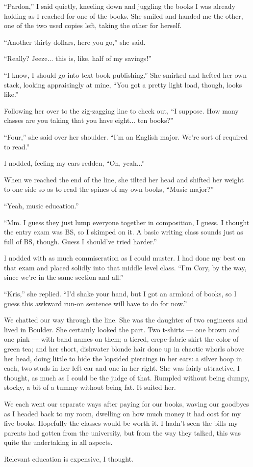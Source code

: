 ``Pardon,'' I said quietly, kneeling down and juggling the books I was already holding as I reached for one of the books.  She smiled and handed me the other, one of the two used copies left, taking the other for herself.

``Another thirty dollars, here you go,'' she said.

``Really?  Jeeze... this is, like, half of my savings!''

``I know, I should go into text book publishing.''  She smirked and hefted her own stack, looking appraisingly at mine, ``You got a pretty light load, though, looks like.''

Following her over to the zig-zagging line to check out, ``I suppose.  How many classes are you taking that you have eight... ten books?''

``Four,'' she said over her shoulder.  ``I'm an English major.  We're sort of required to read.''

I nodded, feeling my ears redden, ``Oh, yeah...''

When we reached the end of the line, she tilted her head and shifted her weight to one side so as to read the spines of my own books, ``Music major?''

``Yeah, music education.''

``Mm.  I guess they just lump everyone together in composition, I guess.  I thought the entry exam was BS, so I skimped on it.  A basic writing class sounds just as full of BS, though.  Guess I should've tried harder.''

I nodded with as much commiseration as I could muster.  I had done my best on that exam and placed solidly into that middle level class.  ``I'm Cory, by the way, since we're in the same section and all.''

``Kris,'' she replied.  ``I'd shake your hand, but I got an armload of books, so I guess this awkward run-on sentence will have to do for now.''

We chatted our way through the line.  She was the daughter of two engineers and lived in Boulder.  She certainly looked the part.  Two t-shirts --- one brown and one pink --- with band names on them; a tiered, crepe-fabric skirt the color of green tea; and her short, dishwater blonde hair done up in chaotic whorls above her head, doing little to hide the lopsided piercings in her ears: a silver hoop in each, two studs in her left ear and one in her right.  She was fairly attractive, I thought, as much as I could be the judge of that.  Rumpled without being dumpy, stocky, a bit of a tummy without being fat.  It suited her.

We each went our separate ways after paying for our books, waving our goodbyes as I headed back to my room, dwelling on how much money it had cost for my five books.  Hopefully the classes would be worth it.  I hadn't seen the bills my parents had gotten from the university, but from the way they talked, this was quite the undertaking in all aspects.  

Relevant education is expensive, I thought.
